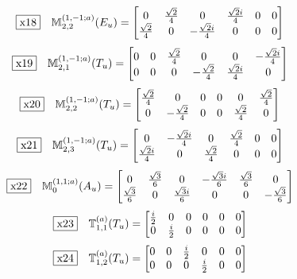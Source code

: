 \documentclass[fleqn,10pt,landscape]{jsarticle}
\begin{document}
\begin{dmath*}
\fbox{x18}\quad \mathbb{M}_{2,2}^{(1,-1;a)}(E_{u})=\begin{bmatrix} 0 & \frac{\sqrt{2}}{4} & 0 & \frac{\sqrt{2} i}{4} & 0 & 0 \\ \frac{\sqrt{2}}{4} & 0 & - \frac{\sqrt{2} i}{4} & 0 & 0 & 0 \end{bmatrix}
\end{dmath*}
\begin{dmath*}
\fbox{x19}\quad \mathbb{M}_{2,1}^{(1,-1;a)}(T_{u})=\begin{bmatrix} 0 & 0 & \frac{\sqrt{2}}{4} & 0 & 0 & - \frac{\sqrt{2} i}{4} \\ 0 & 0 & 0 & - \frac{\sqrt{2}}{4} & \frac{\sqrt{2} i}{4} & 0 \end{bmatrix}
\end{dmath*}
\begin{dmath*}
\fbox{x20}\quad \mathbb{M}_{2,2}^{(1,-1;a)}(T_{u})=\begin{bmatrix} \frac{\sqrt{2}}{4} & 0 & 0 & 0 & 0 & \frac{\sqrt{2}}{4} \\ 0 & - \frac{\sqrt{2}}{4} & 0 & 0 & \frac{\sqrt{2}}{4} & 0 \end{bmatrix}
\end{dmath*}
\begin{dmath*}
\fbox{x21}\quad \mathbb{M}_{2,3}^{(1,-1;a)}(T_{u})=\begin{bmatrix} 0 & - \frac{\sqrt{2} i}{4} & 0 & \frac{\sqrt{2}}{4} & 0 & 0 \\ \frac{\sqrt{2} i}{4} & 0 & \frac{\sqrt{2}}{4} & 0 & 0 & 0 \end{bmatrix}
\end{dmath*}
\begin{dmath*}
\fbox{x22}\quad \mathbb{M}_{0}^{(1,1;a)}(A_{u})=\begin{bmatrix} 0 & \frac{\sqrt{3}}{6} & 0 & - \frac{\sqrt{3} i}{6} & \frac{\sqrt{3}}{6} & 0 \\ \frac{\sqrt{3}}{6} & 0 & \frac{\sqrt{3} i}{6} & 0 & 0 & - \frac{\sqrt{3}}{6} \end{bmatrix}
\end{dmath*}
\begin{dmath*}
\fbox{x23}\quad \mathbb{T}_{1,1}^{(a)}(T_{u})=\begin{bmatrix} \frac{i}{2} & 0 & 0 & 0 & 0 & 0 \\ 0 & \frac{i}{2} & 0 & 0 & 0 & 0 \end{bmatrix}
\end{dmath*}
\begin{dmath*}
\fbox{x24}\quad \mathbb{T}_{1,2}^{(a)}(T_{u})=\begin{bmatrix} 0 & 0 & \frac{i}{2} & 0 & 0 & 0 \\ 0 & 0 & 0 & \frac{i}{2} & 0 & 0 \end{bmatrix}
\end{dmath*}
\end{document}

